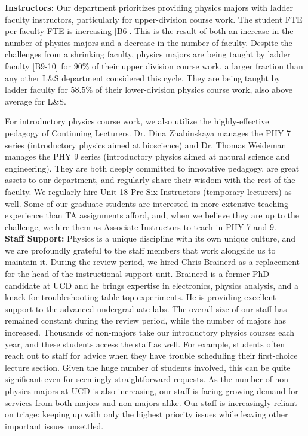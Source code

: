 \documentclass[12pt]{article}
\begin{document}
\noindent
{\bf Instructors:} Our department prioritizes providing physics majors
with ladder faculty instructors, particularly for upper-division
course work.  The student FTE per faculty FTE is increasing [B6].
This is the result of both an increase in the number of physics majors
and a decrease in the number of faculty.  Despite the challenges from
a shrinking faculty, physics majors are being taught by ladder faculty
[B9-10] for $90\%$ of their upper division course work, a larger
fraction than any other L\&S department considered this cycle.  They
are being taught by ladder faculty for $58.5\%$ of their
lower-division physics course work, also above average for L\&S.

For introductory physics course work, we also utilize the
highly-effective pedagogy of Continuing Lecturers.  Dr. Dina
Zhabinskaya manages the PHY 7 series (introductory physics aimed at
bioscience) and Dr. Thomas Weideman manages the PHY 9 series (introductory
physics aimed at natural science and engineering).  They are both
deeply committed to innovative pedagogy, are great assets to our
department, and regularly share their wisdom with the rest of the
faculty.  We regularly hire Unit-18 Pre-Six Instructors (temporary
lecturers) as well.  Some of our graduate students are interested in
more extensive teaching experience than TA assignments afford,
and, when we believe they are up to the challenge, we hire
them as Associate Instructors to teach in PHY 7 and 9.\\[3pt]

\noindent
{\bf Staff Support:} Physics is a unique discipline with its own
unique culture, and we are profoundly grateful to the staff members
that work alongside us to maintain it.  During the review period, we hired Chris Brainerd as a replacement for the head of the instructional support unit.  Brainerd is a former PhD candidate at UCD and he brings expertise in electronics, physics analysis, and a knack for troubleshooting table-top experiments.  He is providing excellent support to the advanced undergraduate labs. The overall size of our staff has remained constant during the review period, while the number of majors has increased.  Thousands of non-majors take our introductory physics courses each year, and these students access the staff as well.  For example, students often reach out to staff for advice when they have trouble scheduling their first-choice lecture section.  Given the huge number of students involved, this can be quite significant even for seemingly straightforward requests.  As the number of non-physics majors at UCD is also increasing, our staff is facing growing demand for services from both majors and non-majors alike.   Our staff is increasingly reliant on triage: keeping up with only the highest priority issues while leaving other important issues unsettled.\\[3pt]
\end{document}
